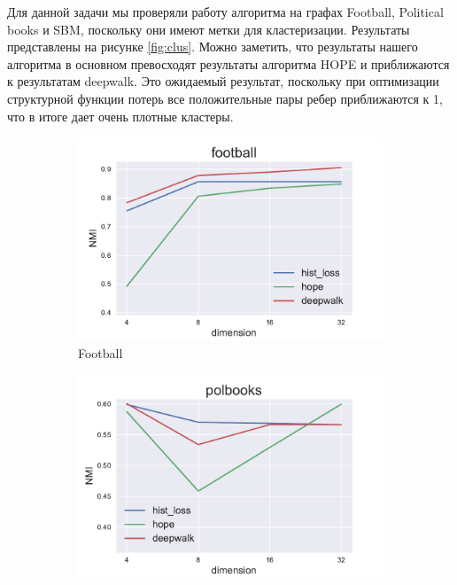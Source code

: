 \documentclass[12pt,a4paper]{extarticle}
\begin{document}
    Для данной задачи мы проверяли работу алгоритма на графах Football, Political books и SBM, поскольку они имеют метки для кластеризации.
    Результаты представлены на рисунке \ref{fig:clus}.
    Можно заметить, что результаты нашего алгоритма в основном превосходят результаты алгоритма HOPE и приближаются к результатам deepwalk.
    Это ожидаемый результат, поскольку при оптимизации структурной функции потерь все положительные пары ребер приближаются к 1, что в итоге дает очень плотные кластеры.
    
    \begin{figure}
    \begin{subfigure}{.5\linewidth}
    \centering
    \includegraphics[width=\linewidth]{src/images/Node_clusterization_football.pdf}
    \caption{Football}
    \label{fig:clus_foot}
    \end{subfigure}
    \begin{subfigure}{.5\linewidth}
    \centering
    \includegraphics[width=\linewidth]{src/images/Node_clusterization_polbooks.pdf}

\end{subfigure}
\end{figure}
\end{document}
